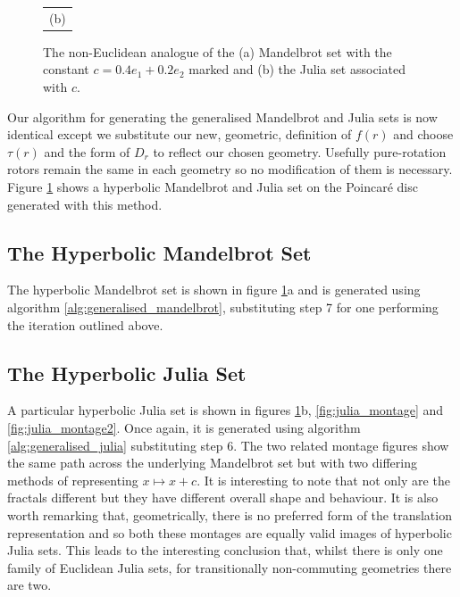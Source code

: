 \begin{figure}[p]
\begin{tabular}{c}
                          (b)
\end{tabular}
\caption{\label{fig:noneuclidean_sets}The non-Euclidean analogue of the (a) Mandelbrot set with
  the constant $c = 0.4e_1 + 0.2e_2$ marked and (b) the Julia
  set associated with $c$.}
\end{figure}

Our algorithm for generating the generalised Mandelbrot and Julia sets is now identical
except we substitute our new, geometric, definition of $f(r)$ and choose $\tau(r)$
and the form of $D_r$ to reflect our chosen geometry. Usefully pure-rotation rotors remain
the same in each geometry so no modification of them is necessary. Figure
\ref{fig:noneuclidean_sets} shows a hyperbolic Mandelbrot and Julia set on the
Poincar\'e disc generated with this method. 

\subsection{The Hyperbolic Mandelbrot Set}

The hyperbolic Mandelbrot set is shown in figure \ref{fig:noneuclidean_sets}a and
is generated using algorithm \ref{alg:generalised_mandelbrot}, substituting
step 7 for one performing the iteration outlined above. 

\subsection{The Hyperbolic Julia Set}

A particular hyperbolic Julia set is shown in figures \ref{fig:noneuclidean_sets}b,
\ref{fig:julia_montage} and \ref{fig:julia_montage2}.  Once again, it is generated using algorithm
\ref{alg:generalised_julia} substituting step 6. The two related montage figures show the same path
across the underlying Mandelbrot set but with two differing methods of representing
$x \mapsto x+c$. It is interesting to note that not only are the fractals different but they have different
overall shape and behaviour. It is also worth remarking that, geometrically, there is no preferred form
of the translation representation and so both these montages are equally valid images of hyperbolic Julia sets.
This leads to the interesting conclusion that, whilst there is only one family of Euclidean Julia sets, for
transitionally non-commuting geometries there are two.

